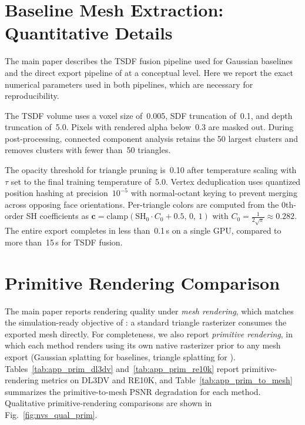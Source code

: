 \section{Baseline Mesh Extraction: Quantitative Details}
\label{sec:app_baseline_mesh}

The main paper describes the TSDF fusion pipeline used for Gaussian baselines and the direct export pipeline of \method at a conceptual level. Here we report the exact numerical parameters used in both pipelines, which are necessary for reproducibility.

The TSDF volume uses a voxel size of~0.005, SDF truncation of~0.1, and depth truncation of~5.0. Pixels with rendered alpha below~0.3 are masked out. During post-processing, connected component analysis retains the 50 largest clusters and removes clusters with fewer than~50 triangles.

The opacity threshold for triangle pruning is~0.10 after temperature scaling with $\tau$ set to the final training temperature of~5.0. Vertex deduplication uses quantized position hashing at precision~$10^{-5}$ with normal-octant keying to prevent merging across opposing face orientations. Per-triangle colors are computed from the 0th-order SH coefficients as $\mathbf{c} = \mathrm{clamp}(\mathrm{SH}_0 \cdot C_0 + 0.5,\, 0,\, 1)$ with $C_0 = \frac{1}{2\sqrt{\pi}} \approx 0.282$. The entire export completes in less than~0.1\,s on a single GPU, compared to more than~15\,s for TSDF fusion.

\section{Primitive Rendering Comparison}
\label{sec:app_prim_render}

The main paper reports rendering quality under \emph{mesh rendering}, which matches the simulation-ready objective of \method: a standard triangle rasterizer consumes the exported mesh directly. For completeness, we also report \emph{primitive rendering}, in which each method renders using its own native rasterizer prior to any mesh export (Gaussian splatting for baselines, triangle splatting for \method). Tables~\ref{tab:app_prim_dl3dv} and~\ref{tab:app_prim_re10k} report primitive-rendering metrics on DL3DV and RE10K, and Table~\ref{tab:app_prim_to_mesh} summarizes the primitive-to-mesh PSNR degradation for each method. Qualitative primitive-rendering comparisons are shown in Fig.~\ref{fig:nvs_qual_prim}.


